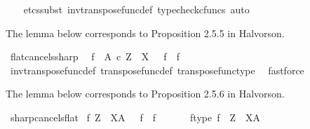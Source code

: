\begin{isabellebody}
\ \ \isamarkupfalse%
\ {\isacharparenleft}{\kern0pt}{\isacharparenleft}{\kern0pt}etcs{\isacharunderscore}{\kern0pt}subst\ inv{\isacharunderscore}{\kern0pt}transpose{\isacharunderscore}{\kern0pt}func{\isacharunderscore}{\kern0pt}def{}{\isacharparenright}{\kern0pt}{\isacharplus}{\kern0pt}{\isacharcomma}{\kern0pt}\ typecheck{\isacharunderscore}{\kern0pt}cfuncs{\isacharcomma}{\kern0pt}\ auto{\isacharparenright}{\kern0pt}%
\endisatagproof
{\isafoldproof}%
%
\isadelimproof
%
\endisadelimproof
%
\begin{isamarkuptext}%
The lemma below corresponds to Proposition 2.5.5 in Halvorson.%
\end{isamarkuptext}\isamarkuptrue%
\isamarkupfalse%
\ flat{\isacharunderscore}{\kern0pt}cancels{\isacharunderscore}{\kern0pt}sharp{\isacharcolon}{\kern0pt}\isanewline
\ \ {\isachardoublequoteopen}f\ {\isacharcolon}{\kern0pt}\ A\ {\isasymtimes}\isactrlsub c\ Z\ {\isasymrightarrow}\ X\ \ {\isasymLongrightarrow}\ {\isacharparenleft}{\kern0pt}f\isactrlsup {\isasymsharp}{\isacharparenright}{\kern0pt}\isactrlsup {\isasymflat}\ {\isacharequal}{\kern0pt}\ f{\isachardoublequoteclose}\isanewline
%
\isadelimproof
\ \ %
\endisadelimproof
%
\isatagproof
{}\isamarkupfalse%
\ inv{\isacharunderscore}{\kern0pt}transpose{\isacharunderscore}{\kern0pt}func{\isacharunderscore}{\kern0pt}def{}\ transpose{\isacharunderscore}{\kern0pt}func{\isacharunderscore}{\kern0pt}def\ transpose{\isacharunderscore}{\kern0pt}func{\isacharunderscore}{\kern0pt}type\ \isamarkupfalse%
\ fastforce%
\endisatagproof
{\isafoldproof}%
%
\isadelimproof
%
\endisadelimproof
%
\begin{isamarkuptext}%
The lemma below corresponds to Proposition 2.5.6 in Halvorson.%
\end{isamarkuptext}\isamarkuptrue%
\isamarkupfalse%
\ sharp{\isacharunderscore}{\kern0pt}cancels{\isacharunderscore}{\kern0pt}flat{\isacharcolon}{\kern0pt}\isanewline
\ {\isachardoublequoteopen}f{\isacharcolon}{\kern0pt}\ Z\ {\isasymrightarrow}\ X\isactrlbsup A\isactrlesup \ \ {\isasymLongrightarrow}\ {\isacharparenleft}{\kern0pt}f\isactrlsup {\isasymflat}{\isacharparenright}{\kern0pt}\isactrlsup {\isasymsharp}\ {\isacharequal}{\kern0pt}\ f{\isachardoublequoteclose}\isanewline
%
\isadelimproof
%
\endisadelimproof
%
\isatagproof
{}\isamarkupfalse%
\ {\isacharminus}{\kern0pt}\ \isanewline
\ \ \isamarkupfalse%
\ f{\isacharunderscore}{\kern0pt}type{\isacharcolon}{\kern0pt}\ {\isachardoublequoteopen}f\ {\isacharcolon}{\kern0pt}\ Z\ {\isasymrightarrow}\ X\isactrlbsup A\isactrlesup {\isachardoublequoteclose}\isanewline

\end{isabellebody}
